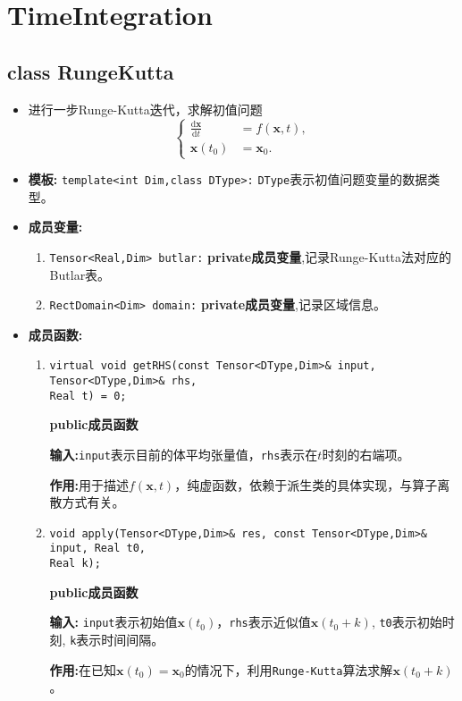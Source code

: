 \documentclass[UTF8]{ctexart}
\theoremstyle{plain}
\theoremstyle{definition}
\theoremstyle{remark}
\newcommand{\dif}{\mathrm{d}}
\newcommand{\difFrac}[2]{\frac{\dif #1}{\dif #2}}
\begin{document}
\section{TimeIntegration}
\subsection{class RungeKutta}
\begin{itemize}
    \item 进行一步Runge-Kutta迭代，求解初值问题
    \begin{equation}
        \left\{
            \begin{aligned}
        \difFrac{\mathbf{x}}{t}&=f(\mathbf{x},t),\\
        \mathbf{x}(t_{0})&=\mathbf{x}_{0}.
            \end{aligned}
        \right.
    \end{equation}
    \item \textbf{模板:} \texttt{template<int Dim,class DType>:} \texttt{DType}表示初值问题变量的数据类型。
    \item \textbf{成员变量:}
    \begin{enumerate}
        \item \texttt{Tensor<Real,Dim> butlar:} \textbf{private成员变量},记录Runge-Kutta法对应的Butlar表。
        \item \texttt{RectDomain<Dim> domain:} \textbf{private成员变量},记录区域信息。
    \end{enumerate}
    \item \textbf{成员函数:}
    \begin{enumerate}
        \item \texttt{virtual void getRHS(const Tensor<DType,Dim>\& input, Tensor<DType,Dim>\& rhs, \\Real t) = 0;}
        
        \textbf{public成员函数}

        \textbf{输入:}\texttt{input}表示目前的体平均张量值，\texttt{rhs}表示在$t$时刻的右端项。

        \textbf{作用:}用于描述$f(\mathbf{x},t)$，纯虚函数，依赖于派生类的具体实现，与算子离散方式有关。
        \item \texttt{void apply(Tensor<DType,Dim>\& res, const Tensor<DType,Dim>\& input, Real t0,\\ Real k);}
        
        \textbf{public成员函数}

        \textbf{输入:} \texttt{input}表示初始值$\textbf{x}(t_{0})$，\texttt{rhs}表示近似值$\textbf{x}(t_{0}+k)$, \texttt{t0}表示初始时刻, \texttt{k}表示时间间隔。

        \textbf{作用:}在已知$\mathbf{x}(t_{0})=\mathbf{x}_{0}$的情况下，利用\texttt{Runge-Kutta}算法求解$\mathbf{x}(t_{0}+k)$。
    \end{enumerate}
\end{itemize}
\end{document}
